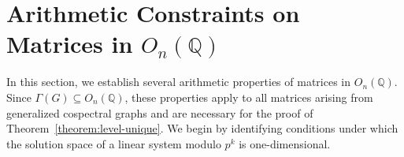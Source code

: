 \documentclass[12pt]{article}
\theoremstyle{plain}
\theoremstyle{definition}
\begin{document}
\section{Arithmetic Constraints on Matrices in $O_n(\mathbb{Q})$}
\label{section:onq}


In this section, we establish several arithmetic properties of matrices in $O_n(\mathbb{Q})$. Since $\Gamma(G) \subseteq O_n(\mathbb{Q})$, these properties apply to all matrices arising from generalized cospectral graphs and are necessary for the proof of Theorem~\ref{theorem:level-unique}. We begin by identifying conditions under which the solution space of a linear system modulo $p^k$ is one-dimensional.
\end{document}
